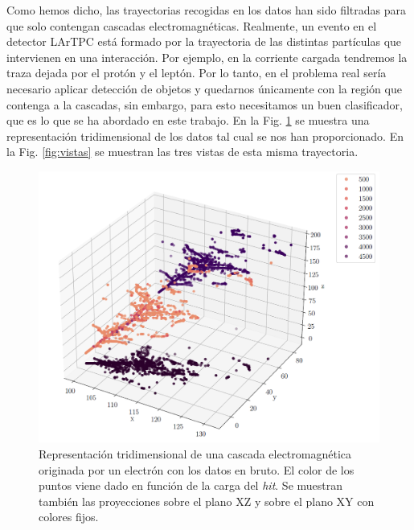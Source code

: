 \documentclass[a4paper,12pt,oneside,titlepage]{book}
\begin{document}
Como hemos dicho, las trayectorias recogidas en los datos han sido filtradas para que solo contengan cascadas electromagnéticas. Realmente, un evento en el detector LArTPC está formado por la trayectoria de las distintas partículas que intervienen en una interacción. Por ejemplo, en la corriente cargada tendremos la traza dejada por el protón y el leptón. Por lo tanto, en el problema real sería necesario aplicar detección de objetos y quedarnos únicamente con la región que contenga a la cascadas, sin embargo, para esto necesitamos un buen clasificador, que es lo que se ha abordado en este trabajo. %
En la Fig. \ref{fig:3d} se muestra una representación tridimensional de los datos tal cual se nos han proporcionado. En la Fig. \ref{fig:vistas} se muestran las tres vistas de esta misma trayectoria.
\begin{figure}[h!]
  \centering
  \includegraphics[scale=0.70, center]{3d_3.PNG}
  \caption{Representación tridimensional de una cascada electromagnética originada por un electrón con los datos en bruto. El color de los puntos viene dado en función de la carga del \textit{hit}. Se muestran también las proyecciones sobre el plano XZ y sobre el plano XY con colores fijos.}
  \label{fig:3d}
\end{figure}
\end{document}
